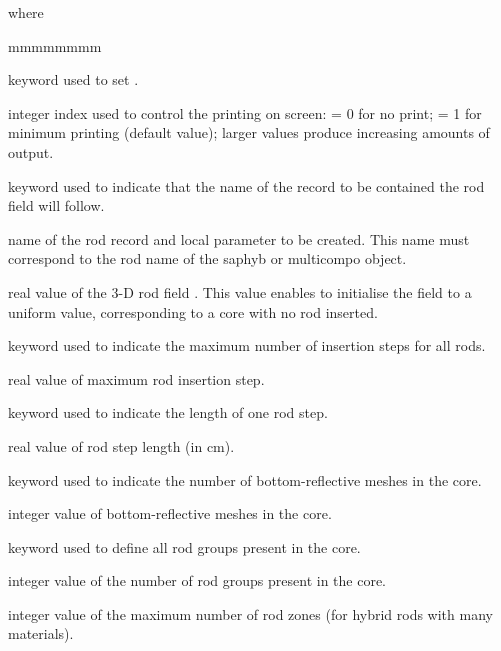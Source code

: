 \noindent where

\begin{ListeDeDescription}{mmmmmmmm}

\item[\moc{EDIT}] keyword used to set .

\item[\dusa{iprint}] integer index used to control the printing on screen:
 = 0 for no print; = 1 for minimum printing (default value); larger values
produce increasing amounts of output.

\item[\moc{PARA}] keyword used to indicate that the name of the record to be
contained the rod field will follow.

\item[\dusa{par1}] name of the rod record and local parameter to be created. This name must correspond to the rod name of the {\sc saphyb} or {\sc multicompo} object.

\item[\dusa{val1}] real value of the 3-D rod field . This value enables to initialise the field to a uniform value, corresponding to a core with no rod inserted.

\item[\moc{LINS}] keyword used to indicate the maximum number of insertion steps 
for all rods.

\item[\dusa{insm}] real value of maximum rod insertion step.

\item[\moc{STEP}] keyword used to indicate the length of one rod step.

\item[\dusa{step}] real value of rod step length (in cm).

\item[\moc{NRFB}] keyword used to indicate the number of bottom-reflective meshes
in the core.

\item[\dusa{nrfb}] integer value of bottom-reflective meshes in the core.

\item[\moc{RGRP}] keyword used to define all rod groups present in the core.

\item[\dusa{ngrp}] integer value of the number of rod groups present in the core.

\item[\dusa{maxmix}] integer value of the maximum number of rod zones (for hybrid 
rods with many materials).


\end{ListeDeDescription}
